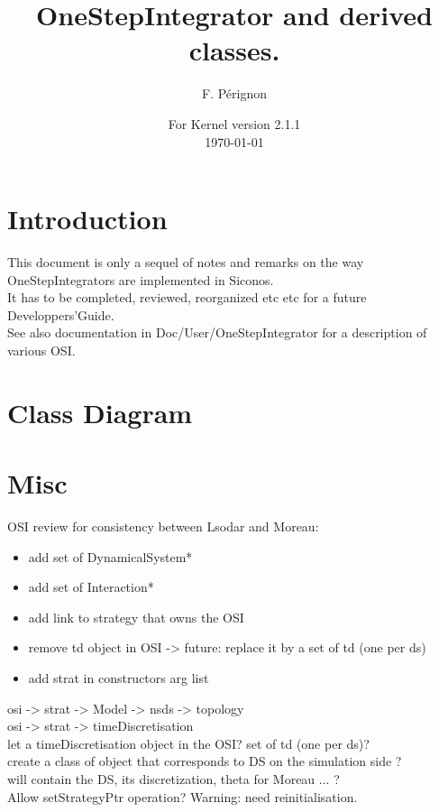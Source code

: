 \documentclass[10pt]{article}
\begin{document}
\thispagestyle{empty}
\title{OneStepIntegrator and derived classes.}
\author{F. P\'erignon}

\date{For Kernel version 2.1.1 \\
 \today}
\maketitle

\pagestyle{fancy}

\section{Introduction}
This document is only a sequel of notes and remarks on the way OneStepIntegrators are implemented in Siconos.\\
It has to be completed, reviewed, reorganized etc etc for a future Developpers'Guide. \\
See also documentation in Doc/User/OneStepIntegrator for a description of various OSI.

\section{Class Diagram}

\section{Misc}

OSI review for consistency between Lsodar and Moreau:
\begin{itemize}
\item add set of DynamicalSystem*
\item add set of Interaction* 
\item add link to strategy that owns the OSI
\item remove td object in OSI -> future: replace it by a set of td (one per ds)
\item add strat in constructors arg list
\end{itemize}


osi -> strat -> Model -> nsds -> topology \\
osi -> strat -> timeDiscretisation \\

let a timeDiscretisation object in the OSI? set of td (one per ds)? \\
create a class of object that corresponds to DS on the simulation side ? \\
will contain the DS, its discretization, theta for Moreau ... ? \\ 
Allow setStrategyPtr operation? Warning: need reinitialisation. \\
\end{document}
